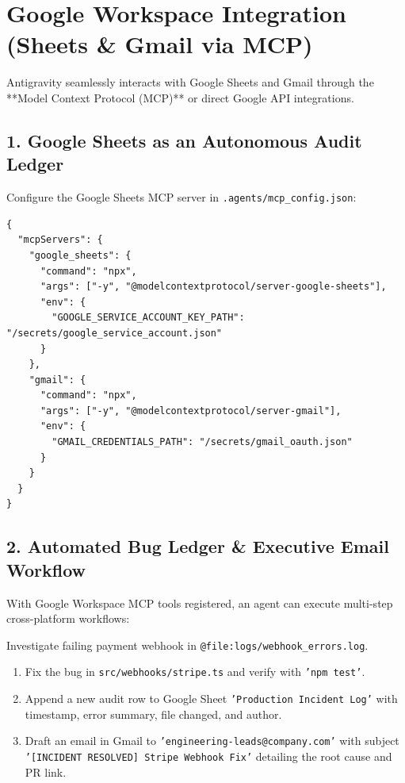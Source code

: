 \documentclass[11pt,a4paper,oneside]{book}
\begin{document}
\section{Google Workspace Integration (Sheets \& Gmail via MCP)}
Antigravity seamlessly interacts with Google Sheets and Gmail through the **Model Context Protocol (MCP)** or direct Google API integrations.

\subsection{1. Google Sheets as an Autonomous Audit Ledger}
Configure the Google Sheets MCP server in \texttt{.agents/mcp\_config.json}:

\begin{lstlisting}[caption={Connecting Google Sheets MCP Server}]
{
  "mcpServers": {
    "google_sheets": {
      "command": "npx",
      "args": ["-y", "@modelcontextprotocol/server-google-sheets"],
      "env": {
        "GOOGLE_SERVICE_ACCOUNT_KEY_PATH": "/secrets/google_service_account.json"
      }
    },
    "gmail": {
      "command": "npx",
      "args": ["-y", "@modelcontextprotocol/server-gmail"],
      "env": {
        "GMAIL_CREDENTIALS_PATH": "/secrets/gmail_oauth.json"
      }
    }
  }
}
\end{lstlisting}

\subsection{2. Automated Bug Ledger \& Executive Email Workflow}
With Google Workspace MCP tools registered, an agent can execute multi-step cross-platform workflows:

\begin{promptbox}
Investigate failing payment webhook in \texttt{@file:logs/webhook\_errors.log}.
\begin{enumerate}
    \item Fix the bug in \texttt{src/webhooks/stripe.ts} and verify with \texttt{'npm test'}.
    \item Append a new audit row to Google Sheet \texttt{'Production Incident Log'} with timestamp, error summary, file changed, and author.
    \item Draft an email in Gmail to \texttt{'engineering-leads@company.com'} with subject \texttt{'[INCIDENT RESOLVED] Stripe Webhook Fix'} detailing the root cause and PR link.
\end{enumerate}
\end{promptbox}
\end{document}
